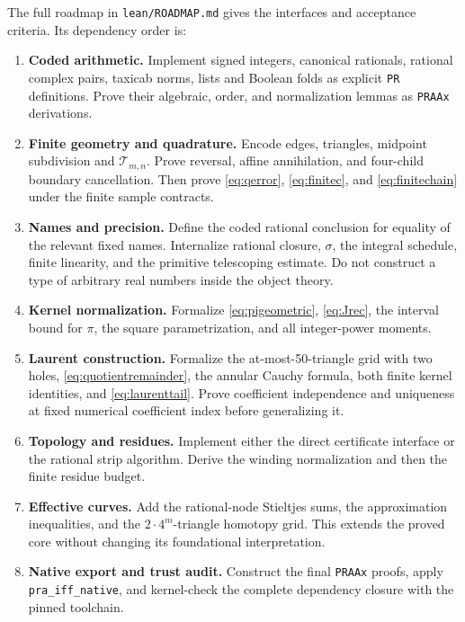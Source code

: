 \documentclass[11pt]{article}
\theoremstyle{definition}
\newcommand{\code}[1]{\texttt{#1}}
\newcommand{\trap}{\mathcal T}
\begin{document}
The full roadmap in \code{lean/ROADMAP.md} gives the interfaces and
acceptance criteria. Its dependency order is:
\begin{enumerate}
 \item \textbf{Coded arithmetic.} Implement signed integers, canonical
 rationals, rational complex pairs, taxicab norms, lists and Boolean
 folds as explicit \code{PR} definitions. Prove their algebraic,
 order, and normalization lemmas as \code{PRAAx} derivations.
 \item \textbf{Finite geometry and quadrature.} Encode edges, triangles,
 midpoint subdivision and \(\trap_{m,n}\). Prove reversal, affine
 annihilation, and four-child boundary cancellation. Then prove
 \eqref{eq:qerror}, \eqref{eq:finitec}, and \eqref{eq:finitechain}
 under the finite sample contracts.
 \item \textbf{Names and precision.} Define the coded rational
 conclusion for equality of the relevant fixed names. Internalize
 rational closure, \(\sigma\), the integral schedule, finite linearity,
 and the primitive telescoping estimate. Do not construct a type of
 arbitrary real numbers inside the object theory.
 \item \textbf{Kernel normalization.} Formalize
 \eqref{eq:pigeometric}, \eqref{eq:Jrec}, the interval bound for
 \(\pi\), the square parametrization, and all integer-power moments.
 \item \textbf{Laurent construction.} Formalize the at-most-50-triangle
 grid with two holes, \eqref{eq:quotientremainder}, the annular
 Cauchy formula, both finite kernel identities, and
 \eqref{eq:laurenttail}. Prove coefficient independence and uniqueness
 at fixed numerical coefficient index before generalizing it.
 \item \textbf{Topology and residues.} Implement either the direct
 certificate interface or the rational strip algorithm. Derive the
 winding normalization and then the finite residue budget.
 \item \textbf{Effective curves.} Add the rational-node Stieltjes sums,
 the approximation inequalities, and the \(2\cdot4^m\)-triangle
 homotopy grid. This extends the proved core without changing its
 foundational interpretation.
 \item \textbf{Native export and trust audit.} Construct the final
 \code{PRAAx} proofs, apply \code{pra\_iff\_native}, and kernel-check
 the complete dependency closure with the pinned toolchain.
\end{enumerate}
\end{document}
